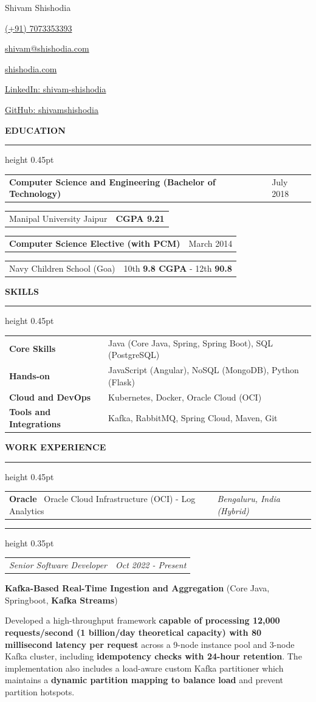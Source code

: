 \documentclass[10pt,a4paper]{article}
\makeatletter
\newcommand{\resumesection}[1]{%
  \vspace{5.8pt}%
  {\fontsize{11.65pt}{13pt}\selectfont\bfseries\MakeUppercase{#1}}\par
  \vspace{2.8pt}%
  {\color{black!70}\hrule height 0.45pt}%
  \vspace{6.2pt}%
}
\newcommand{\twocol}[2]{%
  \noindent\begin{tabularx}{\textwidth}{@{}X>{\raggedleft\arraybackslash}p{2.15in}@{}}
    #1 & #2
  \end{tabularx}%
}
\newcommand{\company}[3]{%
  \twocol{%
    {\fontsize{11.8pt}{13.5pt}\selectfont\textbf{#1}}%
    \hspace{0.45em}%
    {\fontsize{10.8pt}{13.5pt}\selectfont
     \color{black!65}\textbar\ #2}%
  }{\textit{#3}}\par
  \vspace{0.6pt}%
  {\color{black!25}\hrule height 0.35pt}%
  \vspace{2.2pt}%
}
\newcommand{\role}[2]{%
  \twocol{\textit{#1}}{\textit{#2}}\par
  \vspace{2.4pt}%
}
\newcommand{\project}[2]{\textbf{#1} (#2)\par\vspace{2.0pt}}
\newcommand{\contactsep}{%
  \hspace{0.65em}%
  \textcolor{black!40}{\textbar}%
  \hspace{0.65em}%
}
\makeatother
\begin{document}
\begin{center}
  {\fontsize{24pt}{27pt}\selectfont Shivam Shishodia}\par
  \vspace{2pt}
  {\fontsize{9.5pt}{11.4pt}\selectfont
    \href{tel:+917073353393}{(+91) 7073353393}
    \contactsep
    \href{mailto:shivam@shishodia.com}{shivam@shishodia.com}
    \contactsep
    \href{https://shishodia.com}{shishodia.com}
    \contactsep
    \href{https://www.linkedin.com/in/shivam-shishodia}{LinkedIn: shivam-shishodia}
    \contactsep
    \href{https://github.com/shivamshishodia}{GitHub: shivamshishodia}
  }
\end{center}
\vspace{-12pt}

\resumesection{Education}

\twocol{\textbf{Computer Science and Engineering (Bachelor of Technology)}}{July 2018}\par
\twocol{Manipal University Jaipur}{\textbf{CGPA 9.21}}\par
\vspace{2pt}
\twocol{\textbf{Computer Science Elective (with PCM)}}{March 2014}\par
\twocol{Navy Children School (Goa)}{10th \textbf{9.8 CGPA} - 12th \textbf{90.8}}\par

\resumesection{Skills}

\begin{tabularx}{\textwidth}{@{}>{\bfseries}p{1.85in}X@{}}
Core Skills & Java (Core Java, Spring, Spring Boot), SQL (PostgreSQL) \\
Hands-on & JavaScript (Angular), NoSQL (MongoDB), Python (Flask) \\
Cloud and DevOps & Kubernetes, Docker, Oracle Cloud (OCI) \\
Tools and Integrations & Kafka, RabbitMQ, Spring Cloud, Maven, Git
\end{tabularx}

\resumesection{Work Experience}

\company{Oracle}{Oracle Cloud Infrastructure (OCI) - Log Analytics}{Bengaluru, India (Hybrid)}
\role{Senior Software Developer}{Oct 2022 - Present}
\project{Kafka-Based Real-Time Ingestion and Aggregation}{Core Java, Springboot, \textbf{Kafka Streams}}
Developed a high-throughput framework \textbf{capable of processing 12,000 requests/second (1 billion/day theoretical capacity) with 80 millisecond latency per request} across a 9-node instance pool and 3-node Kafka cluster, including \textbf{idempotency checks with 24-hour retention}. The implementation also includes a load-aware custom Kafka partitioner which maintains a \textbf{dynamic partition mapping to balance load} and prevent partition hotspots.
\end{document}
